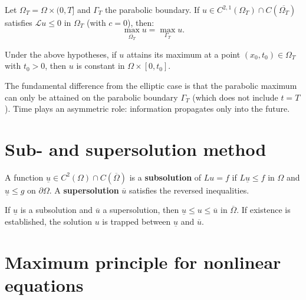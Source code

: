 \begin{theorem}
Let $\Omega_T = \Omega \times (0,T]$ and $\Gamma_T$ the parabolic boundary.
If $u \in C^{2,1}(\Omega_T) \cap C(\overline{\Omega_T})$ satisfies
$\mathcal{L}u \leq 0$ in $\Omega_T$ (with $c = 0$), then:
\begin{equation}\label{eq:parabolic_max}
    \max_{\overline{\Omega_T}} u = \max_{\Gamma_T} u.
\end{equation}
\end{theorem}

\begin{theorem}
Under the above hypotheses, if $u$ attains its maximum at a point
$(x_0, t_0) \in \Omega_T$ with $t_0 > 0$, then $u$ is constant in
$\Omega \times [0, t_0]$.
\end{theorem}

\begin{remark}
The fundamental difference from the elliptic case is that the parabolic
maximum can only be attained on the parabolic boundary $\Gamma_T$
(which does not include $t = T$). Time plays an asymmetric role:
information propagates only into the future.
\end{remark}

\section{Sub- and supersolution method}

\begin{definition}
A function $\underline{u} \in C^2(\Omega) \cap C(\overline{\Omega})$ is a
\textbf{subsolution} of $Lu = f$ if $L\underline{u} \leq f$ in $\Omega$
and $\underline{u} \leq g$ on $\partial\Omega$. A \textbf{supersolution}
$\overline{u}$ satisfies the reversed inequalities.
\end{definition}

\begin{theorem}
If $\underline{u}$ is a subsolution and $\overline{u}$ a supersolution,
then $\underline{u} \leq u \leq \overline{u}$ in $\overline{\Omega}$.
If existence is established, the solution $u$ is trapped between
$\underline{u}$ and $\overline{u}$.
\end{theorem}

\section{Maximum principle for nonlinear equations}

